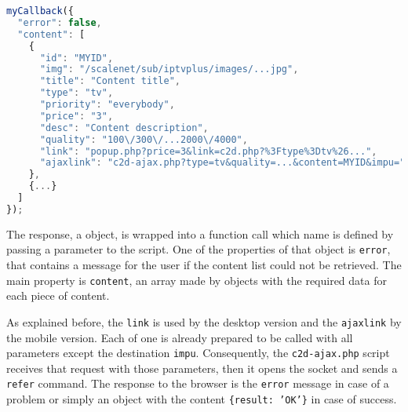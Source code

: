 \begin{lstlisting}[language=JavaScript,label=iptvplusjson,caption=JSON content list example]
myCallback({
  "error": false,
  "content": [
    {
      "id": "MYID",
      "img": "/scalenet/sub/iptvplus/images/...jpg",
      "title": "Content title",
      "type": "tv",
      "priority": "everybody",
      "price": "3",
      "desc": "Content description",
      "quality": "100\/300\/...2000\/4000",
      "link": "popup.php?price=3&link=c2d.php?%3Ftype%3Dtv%26...",
      "ajaxlink": "c2d-ajax.php?type=tv&quality=...&content=MYID&impu="
    },
    {...}
  ]
});
\end{lstlisting}

The response, a  object, is wrapped into a function call which name is defined by passing a parameter to the script.
One of the properties of that object is \texttt{error}, that contains a message for the user if the content list could not be retrieved.
The main property is \texttt{content}, an array made by objects with the required data for each piece of content.

As explained before, the \texttt{link} is used by the desktop version and the \texttt{ajaxlink} by the mobile version.
Each of one is already prepared to be called with all parameters except the destination \texttt{impu}.
Consequently, the \texttt{c2d-ajax.php} script receives that request with those parameters, then it opens the socket and sends a \texttt{refer} command.
The response to the browser is the \texttt{error} message in case of a problem or simply an object with the content \texttt{\{result:~'OK'\}} in case of success.
